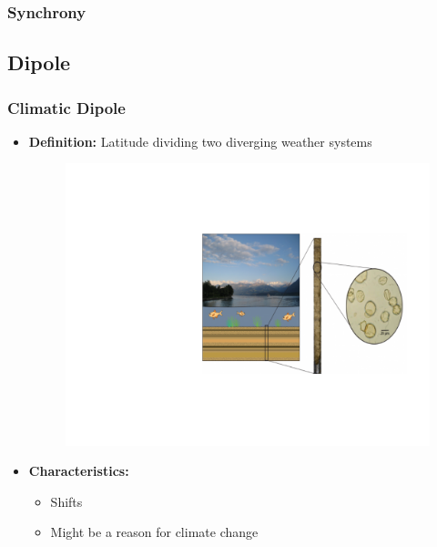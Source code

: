 \documentclass{beamer}
\begin{document}
\begin{frame}
\frametitle{Synchrony}
\end{frame}






\subsection{Dipole}
\begin{frame}
\frametitle{Climatic Dipole}
\begin{itemize}
\item<1-> \textbf{Definition: }Latitude dividing two diverging weather systems
\begin{figure}
\includegraphics[width=.49\linewidth]{cores.pdf}
\end{figure}
\item<2-> \textbf{Characteristics: }
	\begin{itemize}
	\item Shifts
    \item Might be a reason for climate change
	\end{itemize}
\end{itemize}
\end{frame}
\end{document}
